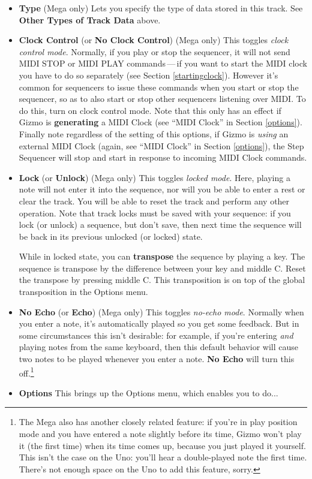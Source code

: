\documentclass{article}
\begin{document}
\begin{itemize}
\item {\bf Type} (Mega only) \quad Lets you specify the type of data stored in this track.  See {\bf Other Types of Track Data} above.
\item {\bf Clock Control} (or {\bf No Clock Control}) (Mega only) \quad This toggles {\it clock control mode}.  Normally, if you play or stop the sequencer, it will not send MIDI STOP or MIDI PLAY commands\,---\,if you want to start the MIDI clock you have to do so separately (see Section \ref{startingclock}).  However it's common for sequencers to issue these commands when you start or stop the sequencer, so as to also start or stop other sequencers listening over MIDI.  To do this, turn on clock control mode.  Note that this only has an effect if Gizmo is {\bf generating} a MIDI Clock (see ``MIDI Clock'' in Section \ref{options}).  Finally note regardless of the setting of this options, if Gizmo is {\it using} an external MIDI Clock (again, see ``MIDI Clock'' in Section \ref{options}), the Step Sequencer will stop and start in response to incoming MIDI Clock commands.
\item {\bf Lock} (or {\bf Unlock}) (Mega only) \quad This toggles {\it locked mode}.  Here, playing a note will not enter it into the sequence, nor will you be able to enter a rest or clear the track.  You will be able to reset the track and perform any other operation.  Note that track locks must be saved with your sequence: if you lock (or unlock) a sequence, but don't save, then next time the sequence will be back in its previous unlocked (or locked) state.

While in locked state, you can {\bf transpose} the sequence by playing a key.  The sequence is transpose by the difference between your key and middle C.  Reset the transpose by pressing middle C.  This transposition is on top of the global transposition in the Options menu.

\item {\bf No Echo} (or {\bf Echo}) (Mega only) \quad This toggles {\it no-echo mode}.  Normally when you enter a note, it's automatically played so you get some feedback.  But in some circumstances this isn't desirable: for example, if you're entering {\it and} playing notes from the same keyboard, then this default behavior will cause two notes to be played whenever you enter a note.  {\bf No Echo} will turn this off.\footnote{The Mega also has another closely related feature: if you're in play position mode and you have entered a note slightly before its time, Gizmo won't play it (the first time) when its time comes up, because you just played it yourself.  This isn't the case on the Uno: you'll hear a double-played note the first time.  There's not enough space on the Uno to add this feature, sorry.}
\item {\bf Options} \quad This brings up the Options menu, which enables you to do...
\end{itemize}
\end{document}
